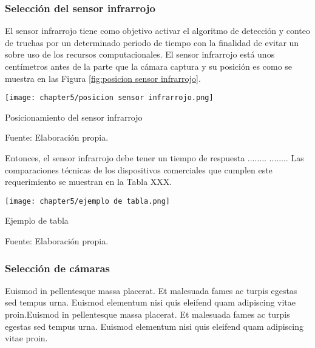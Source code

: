 \subsubsection{Selección del sensor infrarrojo}

El sensor infrarrojo tiene como objetivo activar el algoritmo de detección y conteo de truchas por un determinado periodo de tiempo con la finalidad de evitar un sobre uso de los recursos computacionales. El sensor infrarrojo está unos centímetros antes de la parte que la cámara captura y su posición es como se muestra en las Figura \ref{fig:posicion sensor infrarrojo}.

\begin{myfigure}[H]
	\centering
	\texttt{[image: chapter5/posicion sensor infrarrojo.png]}
	\caption{Posicionamiento del sensor infrarrojo}
	\begin{myflushleftportland}
		Fuente: Elaboración propia.
	\end{myflushleftportland}
	\label{fig:posicion sensor infrarrojo}
\end{myfigure}

Entonces, el sensor infrarrojo debe tener un tiempo de respuesta ........ ........ Las comparaciones técnicas de los dispositivos comerciales que cumplen este requerimiento se muestran en la Tabla XXX.

\begin{myfigure}[H]
	\centering
	\texttt{[image: chapter5/ejemplo de tabla.png]}
	\caption{Ejemplo de tabla}
	\begin{myflushleftportland}
		Fuente: Elaboración propia.
	\end{myflushleftportland}
	\label{fig:ejemplo de tabla}
\end{myfigure}

\subsubsection{Selección de cámaras} 

Euismod in pellentesque massa placerat. Et malesuada fames ac turpis egestas sed tempus urna. Euismod elementum nisi quis eleifend quam adipiscing vitae proin.Euismod in pellentesque massa placerat. Et malesuada fames ac turpis egestas sed tempus urna. Euismod elementum nisi quis eleifend quam adipiscing vitae proin.

